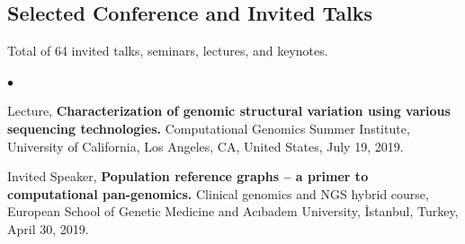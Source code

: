 \documentclass[margin,line]{res}
\newenvironment{list2}{
  \begin{list}{$\bullet$}{%
      \setlength{\itemsep}{0.1cm}
      \setlength{\parsep}{0in} \setlength{\parskip}{0in}
      \setlength{\topsep}{0in} \setlength{\partopsep}{0in} 
      \setlength{\leftmargin}{0.2in}}}{\end{list}}
\newcommand{\junk}[1]{}
\begin{document}
\begin{resume}
\vspace*{-.2cm}
\section{\sc Selected Conference and Invited Talks}
{\small
Total of 64 invited talks, seminars, lectures, and keynotes.
}\\

\begin{list2}

\junk{
 \item
  Invited Speaker, 
  {\bf Characterization of large-scale structural variants using Linked-Reads.}
  Biological Databases and Data Analysis Symposium, Koç University, Turkey, September 9, 2019.
  
  \item
  Invited Speaker, 
  {\bf Characterization of large-scale structural variants using Linked-Reads.} \textit{(in Turkish)}
  Data Science Summer School 2019, Sabancı University, Turkey, September 7, 2019.
  
  
  
  \item
  Conference Talk, 
  {\bf Characterization of large-scale structural variants using Linked-Reads.}
$27^{th}$ Annual
International Conference Intelligent Systems for Molecular Biology (ISMB/ECCB 2019), {\em HiTSeq Track},
Basel, Switzerland, July 23, 2019.
}

\item
  Lecture, 
      {\bf  Characterization of genomic structural variation using various sequencing technologies.}
  Computational Genomics Summer Institute, University of California, Los Angeles, CA, United States,
  July 19, 2019.


\item
Invited Speaker,
{\bf Population reference graphs – a primer to computational pan-genomics.}
 Clinical genomics and NGS hybrid course, European School of Genetic Medicine and Acıbadem University, İstanbul, Turkey, April 30, 2019.
 
 
  \junk{
  
  
\item
  Invited Speaker, 
  {\bf Algorithms to characterize genomic structural variation using high-throughput sequencing technologies.}
  Dept of Biomedical Informatics at Harvard Medical School, Boston, MA, United  States, November 29, 2018.
 
  
\item
  Lecture, 
  {\bf  Characterization of genomic structural variation using various sequencing technologies.}
  Computational Genomics Summer Institute, University of California, Los Angeles, CA, United States,
  July 17, 2018.
  }
  \junk{
\item
  Invited Speaker, 
  {\bf  Characterization of  genome structural variation and large inversions using high throughput sequencing.}
  ETH Zürich, Switzerland, May 7, 2018.
\item
  Invited Speaker, 
  {\bf  Characterization of  genome structural variation and large inversions using high throughput sequencing.}
  Indiana University, Bloomington, IN, United States, April 4, 2018.
}


\end{list2}
\end{resume}
\end{document}
